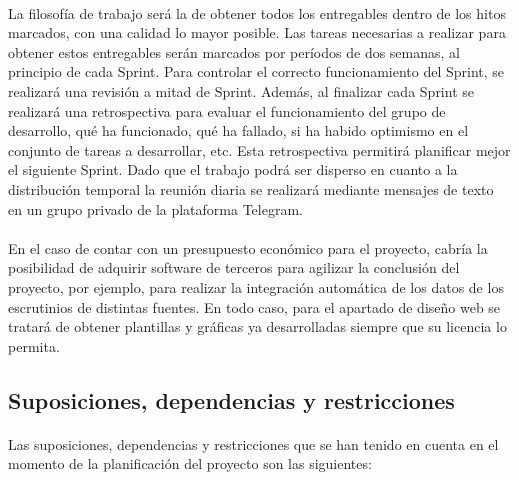 \documentclass{article}
\begin{document}
        \paragraph{} 
        La filosofía de trabajo será la de obtener todos los entregables dentro de los hitos marcados, con una calidad lo mayor posible. Las tareas necesarias a realizar para obtener estos entregables serán marcados por períodos de dos semanas, al principio de cada Sprint. Para controlar el correcto funcionamiento del Sprint, se realizará una revisión a mitad de Sprint. Además, al finalizar cada Sprint se realizará una retrospectiva para evaluar el funcionamiento del grupo de desarrollo, qué ha funcionado, qué ha fallado, si ha habido optimismo en el conjunto de tareas a desarrollar, etc. Esta retrospectiva permitirá planificar mejor el siguiente Sprint. Dado que el trabajo podrá ser disperso en cuanto a la distribución temporal la reunión diaria se realizará mediante mensajes de texto en un grupo privado de la plataforma Telegram.
        
        \paragraph{}
        En el caso de contar con un presupuesto económico para el proyecto, cabría la posibilidad de adquirir software de terceros para agilizar la conclusión del proyecto, por ejemplo, para realizar la integración automática de los datos de los escrutinios de distintas fuentes. En todo caso, para el apartado de diseño web se tratará de obtener plantillas y gráficas ya desarrolladas siempre que su licencia lo permita.
        
       	\subsection{Suposiciones, dependencias y restricciones}
			
            \paragraph{}
            Las suposiciones, dependencias y restricciones que se han tenido en cuenta en el momento de la planificación del proyecto son las siguientes:
            
\end{document}
